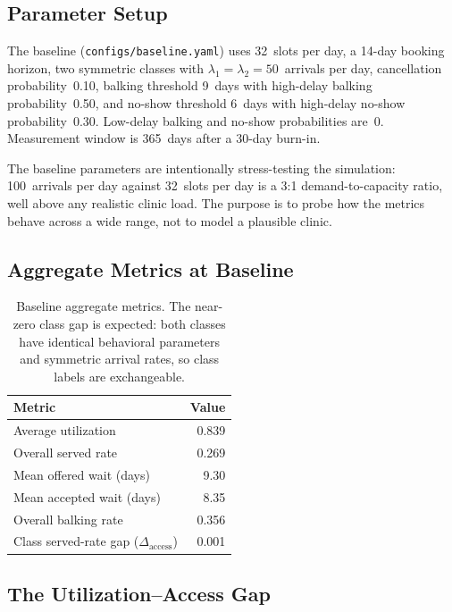 \documentclass[11pt]{article}
\begin{document}
\subsection{Parameter Setup}

The baseline (\texttt{configs/baseline.yaml}) uses 32~slots per day,
a 14-day booking horizon, two symmetric classes with $\lambda_1 = \lambda_2
= 50$~arrivals per day, cancellation probability~0.10, balking threshold
9~days with high-delay balking probability~0.50, and no-show threshold 6~days
with high-delay no-show probability~0.30. Low-delay balking and no-show
probabilities are~0. Measurement window is 365~days after a 30-day burn-in.

The baseline parameters are intentionally stress-testing the simulation:
100~arrivals per day against 32~slots per day is a 3:1 demand-to-capacity
ratio, well above any realistic clinic load. The purpose is to probe how the
metrics behave across a wide range, not to model a plausible clinic.

\subsection{Aggregate Metrics at Baseline}

\begin{table}[H]
\centering
\renewcommand{\arraystretch}{1.15}
\begin{tabular}{lr}
\toprule
Metric & Value \\
\midrule
Average utilization & 0.839 \\
Overall served rate & 0.269 \\
Mean offered wait (days) & 9.30 \\
Mean accepted wait (days) & 8.35 \\
Overall balking rate & 0.356 \\
Class served-rate gap ($\Delta_{\text{access}}$) & 0.001 \\
\bottomrule
\end{tabular}
\caption{Baseline aggregate metrics. The near-zero class gap is expected:
both classes have identical behavioral parameters and symmetric arrival rates,
so class labels are exchangeable.}
\label{tab:baseline}
\end{table}

\subsection{The Utilization--Access Gap}
\end{document}

